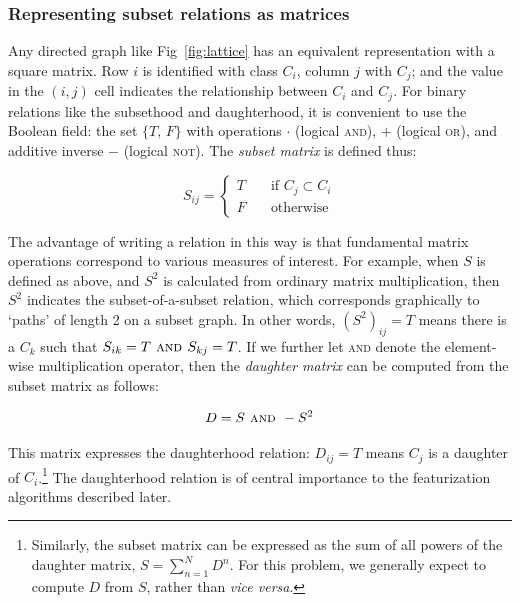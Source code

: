 \documentclass[11pt, oneside]{article}   	%
\begin{document}
\subsubsection{Representing subset relations as matrices}

\vspace{\baselineskip} Any directed graph like Fig~\ref{fig:lattice} has an equivalent representation with a square matrix. Row $i$ is identified with class $C_i$, column $j$ with $C_j$; and the value in the $(i,j)$ cell indicates the relationship between $C_i$ and $C_j$. For binary relations like the subsethood and daughterhood, it is convenient to use the Boolean field: the set $\{T, \, F\}$ with operations $\cdot$ (logical \textsc{and}), $+$ (logical \textsc{or}), and additive inverse $-$ (logical \textsc{not}). The \textit{subset matrix} is defined thus:

$$S_{ij} = \begin{cases}
                T & \quad \text{if } C_j \subset C_i \\
                F & \quad \text{otherwise}
                \end{cases}$$

\noindent The advantage of writing a relation in this way is that fundamental matrix operations correspond to various measures of interest. For example, when $S$ is defined as above, and $S^2$ is calculated from ordinary matrix multiplication, then $S^2$ indicates the subset-of-a-subset relation, which corresponds graphically to `paths' of length 2 on a subset graph. In other words, $(S^2)_{ij} = T$ means there is a $C_k$ such that $S_{ik} = T \textsc{ and } S_{kj} = T$. If we further let \textsc{and} denote the element-wise multiplication operator, then the \textit{daughter matrix} can be computed from the subset matrix as follows: 

$$D = S \textsc{ and } -S^2$$

\noindent This matrix expresses the daughterhood relation: $D_{ij} = T$ means $C_j$ is a daughter of $C_i$.\footnote{Similarly, the subset matrix can be expressed as the sum of all powers of the daughter matrix, \mbox{$S = \sum_{n=1}^N D^n$}. For this problem, we generally expect to compute $D$ from $S$, rather than \textit{vice versa}.} The daughterhood relation is of central importance to the featurization algorithms described later.
\end{document}
